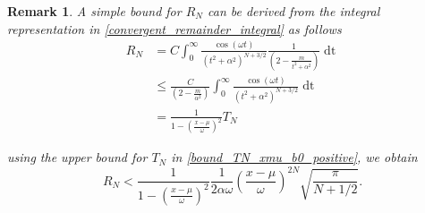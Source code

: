 \documentclass[10pt,a4paper,oneside]{article}
\newtheorem{remark}[theorem]{Remark}
\numberwithin{equation}{section}
\begin{document}
\begin{table}[htp]
	\centering
	\caption{Absolute error estimating $N$ using \eqref{N_expansion_xmu_b0_positive} for the series expansion  \eqref{expansion_xmu_b0_positive} with machine-precision absolute error.}
	\label{table_bound_remainder_xmu_b0_positive_large_N}
\end{table}
\begin{remark}\label{remark_upper_bound_remainder}
A simple bound for $R_N$ can be derived from the integral representation in \eqref{convergent_remainder_integral} as follows
\begin{align*}
R_N &= C \int_0^{\infty} \frac{\cos(\omega t)}{(t^2 + \alpha^2)^{N + 3/2}} \frac{1}{\left(2 - \frac{m}{t^2+ \alpha^2}\right)} \mathop{dt}\\
&\le \frac{C}{\left(2 - \frac{m}{\alpha^2}\right)} \int_0^{\infty} \frac{\cos(\omega t)}{(t^2 + \alpha^2)^{N + 3/2}} \mathop{dt}\\
&= \frac{1}{1 - \left(\frac{x-\mu}{\omega}\right)^2} T_N
\end{align*}

using the upper bound for $T_N$ in \eqref{bound_TN_xmu_b0_positive}, we obtain
\begin{equation}
R_N < \frac{1}{1 - \left(\frac{x-\mu}{\omega}\right)^2} \frac{1}{2\alpha\omega}\left(\frac{x-\mu}{\omega}\right)^{2N} \sqrt{\frac{\pi}{N + 1/2}}.
\end{equation}
\end{remark}
\end{document}

